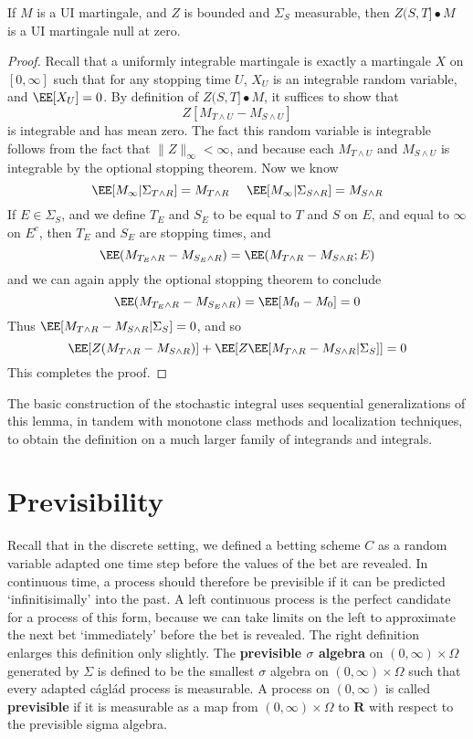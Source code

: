 \begin{lemma}
    If $M$ is a UI martingale, and $Z$ is bounded and $\Sigma_S$ measurable, then $Z(S,T] \bullet M$ is a UI martingale null at zero.
\end{lemma}
\begin{proof}
    Recall that a uniformly integrable martingale is exactly a martingale $X$ on $[0,\infty]$ such that for any stopping time $U$, $X_U$ is an integrable random variable, and $\EE[X_U] = 0$. By definition of $Z(S,T] \bullet M$, it suffices to show that
    \[ Z [M_{T \wedge U} - M_{S \wedge U}] \]
    is integrable and has mean zero. The fact this random variable is integrable follows from the fact that $\| Z \|_\infty < \infty$, and because each $M_{T \wedge U}$ and $M_{S \wedge U}$ is integrable by the optional stopping theorem. Now we know
    \[ \EE[M_\infty | \Sigma_{T \wedge R}] = M_{T \wedge R}\ \ \ \ \EE[M_\infty | \Sigma_{S \wedge R}] = M_{S \wedge R} \]
    If $E \in \Sigma_S$, and we define $T_E$ and $S_E$ to be equal to $T$ and $S$ on $E$, and equal to $\infty$ on $E^c$, then $T_E$ and $S_E$ are stopping times, and
    \[ \EE(M_{T_E \wedge R} - M_{S_E \wedge R}) = \EE(M_{T \wedge R} - M_{S \wedge R}; E) \]
    and we can again apply the optional stopping theorem to conclude
    \[ \EE(M_{T_E \wedge R} - M_{S_E \wedge R}) = \EE[M_0 - M_0] = 0 \]
    Thus $\EE[M_{T \wedge R} - M_{S \wedge R} | \Sigma_S] = 0$, and so
    \[ \EE[Z(M_{T \wedge R} - M_{S \wedge R})] + \EE[Z \EE[M_{T \wedge R} - M_{S \wedge R} | \Sigma_S] ] = 0 \]
    This completes the proof.
\end{proof}

The basic construction of the stochastic integral uses sequential generalizations of this lemma, in tandem with monotone class methods and localization techniques, to obtain the definition on a much larger family of integrands and integrals.

\section{Previsibility}

Recall that in the discrete setting, we defined a betting scheme $C$ as a random variable adapted one time step before the values of the bet are revealed. In continuous time, a process should therefore be previsible if it can be predicted `infinitisimally' into the past. A left continuous process is the perfect candidate for a process of this form, because we can take limits on the left to approximate the next bet `immediately' before the bet is revealed. The right definition enlarges this definition only slightly. The {\bf previsible $\sigma$ algebra} on $(0,\infty) \times \Omega$ generated by $\Sigma$ is defined to be the smallest $\sigma$ algebra on $(0,\infty) \times \Omega$ such that every adapted c\'{a}gl\'{a}d process is measurable. A process on $(0,\infty)$ is called {\bf previsible} if it is measurable as a map from $(0,\infty) \times \Omega$ to $\mathbf{R}$ with respect to the previsible sigma algebra.

